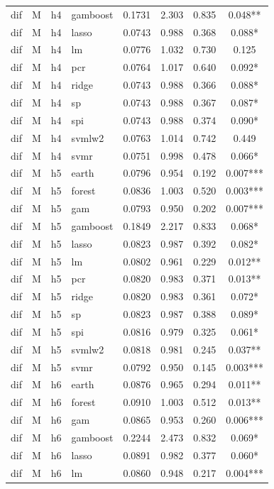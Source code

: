 \begin{ThreePartTable}
\begin{longtable}[t]{llclcccc}
dif & M & h4 & gamboost & 0.1731 & 2.303 & 0.835 & 0.048**\\
dif & M & h4 & lasso & 0.0743 & 0.988 & 0.368 & 0.088*\\
dif & M & h4 & lm & 0.0776 & 1.032 & 0.730 & 0.125\\
dif & M & h4 & pcr & 0.0764 & 1.017 & 0.640 & 0.092*\\
dif & M & h4 & ridge & 0.0743 & 0.988 & 0.366 & 0.088*\\
dif & M & h4 & sp & 0.0743 & 0.988 & 0.367 & 0.087*\\
dif & M & h4 & spi & 0.0743 & 0.988 & 0.374 & 0.090*\\
dif & M & h4 & svmlw2 & 0.0763 & 1.014 & 0.742 & 0.449\\
dif & M & h4 & svmr & 0.0751 & 0.998 & 0.478 & 0.066*\\
\addlinespace
dif & M & h5 & earth & 0.0796 & 0.954 & 0.192 & 0.007***\\
dif & M & h5 & forest & 0.0836 & 1.003 & 0.520 & 0.003***\\
dif & M & h5 & gam & 0.0793 & 0.950 & 0.202 & 0.007***\\
dif & M & h5 & gamboost & 0.1849 & 2.217 & 0.833 & 0.068*\\
dif & M & h5 & lasso & 0.0823 & 0.987 & 0.392 & 0.082*\\
dif & M & h5 & lm & 0.0802 & 0.961 & 0.229 & 0.012**\\
dif & M & h5 & pcr & 0.0820 & 0.983 & 0.371 & 0.013**\\
dif & M & h5 & ridge & 0.0820 & 0.983 & 0.361 & 0.072*\\
dif & M & h5 & sp & 0.0823 & 0.987 & 0.388 & 0.089*\\
dif & M & h5 & spi & 0.0816 & 0.979 & 0.325 & 0.061*\\
dif & M & h5 & svmlw2 & 0.0818 & 0.981 & 0.245 & 0.037**\\
dif & M & h5 & svmr & 0.0792 & 0.950 & 0.145 & 0.003***\\
\addlinespace
dif & M & h6 & earth & 0.0876 & 0.965 & 0.294 & 0.011**\\
dif & M & h6 & forest & 0.0910 & 1.003 & 0.512 & 0.013**\\
dif & M & h6 & gam & 0.0865 & 0.953 & 0.260 & 0.006***\\
dif & M & h6 & gamboost & 0.2244 & 2.473 & 0.832 & 0.069*\\
dif & M & h6 & lasso & 0.0891 & 0.982 & 0.377 & 0.060*\\
dif & M & h6 & lm & 0.0860 & 0.948 & 0.217 & 0.004***\\

\end{longtable}
\end{ThreePartTable}
